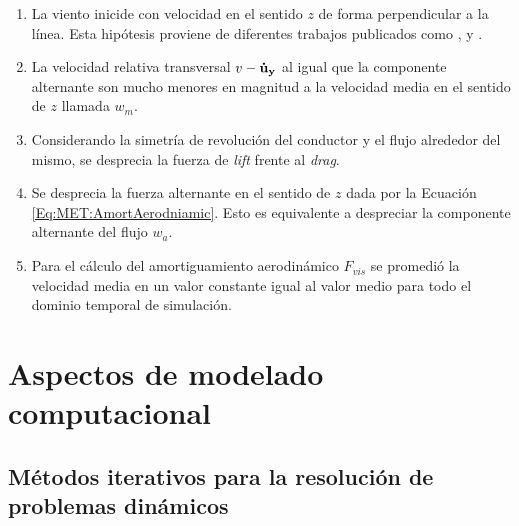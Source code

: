 \begin{enumerate}
	\item La viento inicide con velocidad en el sentido $z$ de forma perpendicular a la línea. Esta hipótesis proviene de diferentes trabajos publicados como \citep{duranona2009analysis}, \citep{yang2016nonlinear} y \citep{stengel2017measurements}.
	\item La velocidad relativa transversal $v-\bf{\dot{u}}_{y}$ al igual que la componente alternante son mucho menores en magnitud a la velocidad media en el sentido de $z$ llamada $w_m$.
	\item Considerando la simetría de revolución del conductor y el flujo alrededor del mismo, se desprecia la fuerza de \textit{lift} frente al \textit{drag}.
	\item Se desprecia la fuerza alternante en el sentido de $z$ dada por la Ecuación \eqref{Eq:MET:AmortAerodniamic}. Esto es equivalente a despreciar la componente alternante del flujo $w_a$.
	\item Para el cálculo del amortiguamiento aerodinámico $F_{vis}$ se promedió la velocidad media en un valor constante igual al valor medio para todo el dominio temporal de simulación.
\end{enumerate}

\section{Aspectos de modelado computacional}\label{Sec:MET:ModeladoComput}
\subsection{Métodos iterativos para la resolución de problemas dinámicos }\label{Sec:MET:EqEquilibrio}


